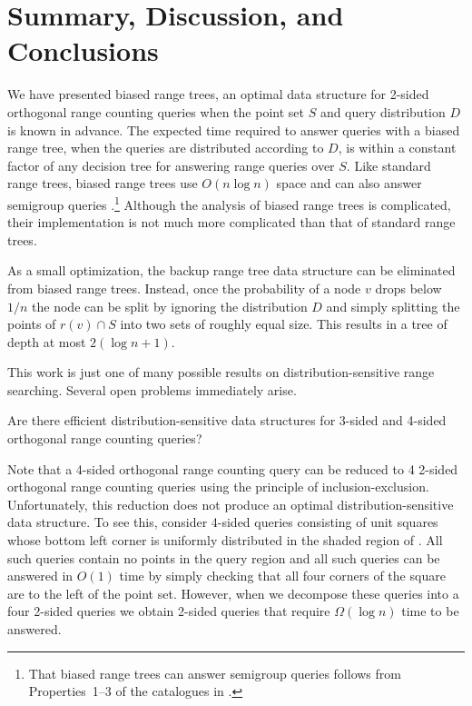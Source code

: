\documentclass[charterfonts]{patmorin}
\begin{document}
\section{Summary, Discussion, and Conclusions}

We have presented biased range trees, an optimal data structure for
2-sided orthogonal range counting queries when the point set $S$ and
query distribution $D$ is known in advance. The expected time required
to answer queries with a biased range tree, when the queries are
distributed according to $D$, is within a constant factor of any
decision tree for answering range queries over $S$.  Like standard
range trees, biased range trees use $O(n\log n)$ space and can also
answer semigroup queries \cite{ae133,ae292}.\footnote{That biased
range trees can answer semigroup queries follows
from Properties~1--3 of the catalogues in .}
Although the analysis of
biased range trees is complicated, their implementation is not much
more complicated than that of standard range trees.

As a small optimization, the backup range tree data structure can be
eliminated from biased range trees.  Instead, once the probability of
a node $v$ drops below $1/n$ the node can be split by ignoring the
distribution $D$ and simply splitting the points of $r(v)\cap S$ into
two sets of roughly equal size.  This results in a tree of depth at
most $2(\log n+1)$.

This work is just one of many possible results on
distribution-sensitive range searching.  Several open problems
immediately arise.  

\begin{op}
Are there efficient distribution-sensitive data structures for 3-sided
and 4-sided orthogonal range counting queries?
\end{op}

Note that a 4-sided orthogonal range counting query can be reduced to
4 2-sided orthogonal range counting queries using the principle of
inclusion-exclusion.  Unfortunately, this reduction does not produce
an optimal distribution-sensitive data structure.  To see this,
consider 4-sided queries consisting of unit squares whose bottom left
corner is uniformly distributed in the shaded region of
.  All such queries contain no points in the query
region and all such queries can be answered in $O(1)$ time by simply
checking that all four corners of the square are to the left of the point
set.  However, when we decompose these queries into a four 2-sided
queries we obtain 2-sided queries that require $\Omega(\log n)$ time
to be answered.
\end{document}
